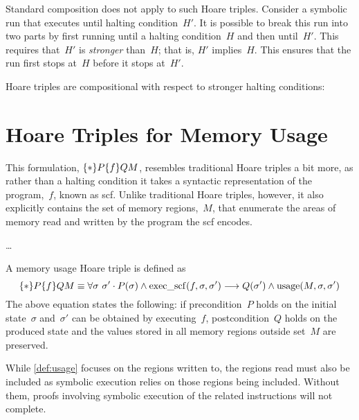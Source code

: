 Standard composition does not apply to such Hoare triples.
Consider a symbolic run that executes until halting condition~$H'$.
It is possible to break this run into two parts
by first running until a halting condition~$H$ and then until~$H'$.
This requires that~$H'$ is \emph{stronger} than~$H$; that is, $H'$ implies~$H$.
This ensures that the run first stops at~$H$ before it stops at~$H'$.
\begin{theorem}\label{thm:comp}
  Hoare triples are compositional with respect to stronger halting conditions:
  \begin{prooftree}
  \end{prooftree}
\end{theorem}

\section{Hoare Triples for Memory Usage}\label{se:hoare2}
This formulation, $\htriple*{P}{f}{Q}{M}$,
resembles traditional Hoare triples a bit more,
as rather than a halting condition
it takes a syntactic representation of the program,~$f$, known as \ac{scf}.
Unlike traditional Hoare triples, however,
it also explicitly contains the set of memory regions,~$M$,
that enumerate the areas of memory read and written by the program
the \ac{scf} encodes.

\todo\dots

\begin{definition}\label{def:usage}
  A memory usage Hoare triple is defined as
  \begin{equation*}
    \htriple*{P}{f}{Q}{M}\equiv
    \forall\sigma~\sigma'\cdot P(\sigma)\wedge\exec(f,\sigma,\sigma')\longrightarrow
    Q(\sigma')\wedge\usage(M,\sigma,\sigma')
  \end{equation*}
  The above equation states the following:
  if precondition~$P$ holds on the initial state~$\sigma$
  and~$\sigma'$ can be obtained by executing~$f$,
  postcondition~$Q$ holds on the produced state
  and the values stored in all memory regions outside set~$M$ are preserved.
\end{definition}
While \cref{def:usage} focuses on the regions written to,
the regions read must also be included as symbolic execution
relies on those regions being included.
Without them, proofs involving symbolic execution
of the related instructions will not complete.

